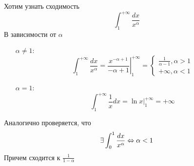 \begin{example}
    Хотим узнать сходимость 
    $$\int_1^{+\infty} \frac{dx}{x^\alpha}$$
    В зависимости от $\alpha$
    \begin{enumerate}
        \item[$\alpha \ne 1$:]
        $$\int_1^{+\infty} \frac{dx}{x^\alpha} = \left. \frac{x^{-\alpha + 1}}{-\alpha + 1}\right|_1^{+\infty} = \left\{\begin{array}{l}
            \frac{1}{\alpha - 1}, \alpha > 1 \\
            +\infty, \alpha < 1
        \end{array}\right.$$
        \item[$\alpha = 1$:] 
        $$\int_1^{+\infty} \frac{1}{x}dx = \left.\ln x\right|_1^{+\infty} = +\infty$$
    \end{enumerate}
\end{example}

\begin{example}
    Аналогично проверяется, что 
    $$\exists \int_{0}^{1}\frac{dx}{x^\alpha} \Leftrightarrow \alpha < 1$$
    Причем сходится к $\frac{1}{1 - \alpha}$
\end{example}